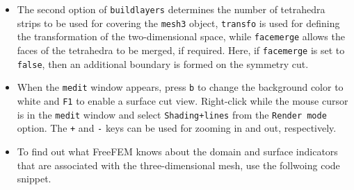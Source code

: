 \documentclass[9pt]{amsart}
\theoremstyle{remark}
\theoremstyle{definition}
\begin{document}
\begin{itemize}
\item The second option of \verb!buildlayers! determines the number of tetrahedra strips to be used for covering the \verb!mesh3! object, \verb!transfo! is used for defining the transformation of the two-dimensional space, while \verb!facemerge! allows the faces of the tetrahedra to be merged, if required. Here, if \verb!facemerge! is set to \verb!false!, then an additional boundary is formed on the symmetry cut.
\item When the \verb!medit! window appears, press \verb!b! to change the background color to white and \verb!F1! to enable a surface cut view. Right-click while the mouse cursor is in the \verb!medit! window and select \verb!Shading+lines! from the \verb!Render mode! option. The \verb!+! and \verb!-! keys can be used for zooming in and out, respectively.
\item To find out what FreeFEM knows about the domain and surface indicators that are associated with the three-dimensional mesh, use the follwoing code snippet.
\end{itemize}
\end{document}
